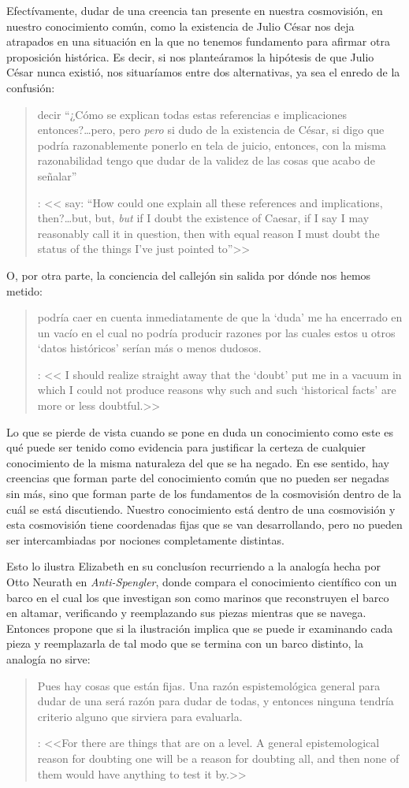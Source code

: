 Efectívamente, dudar de una creencia tan presente en nuestra cosmovisión, en nuestro conocimiento común, como la existencia de Julio César nos deja atrapados en una situación en la que no tenemos fundamento para afirmar otra proposición histórica. Es decir, si nos planteáramos la hipótesis de que Julio César nunca existió, nos situaríamos entre dos alternativas, ya sea el enredo de la confusión: \blockquote[{\cite[91]{anscombe1981parmenides:humeandjulius}}: <<\textelp{} say: ``How could one explain all these references and implications, then?\ldots but, but, \emph{but} if I doubt the existence of Caesar, if I say I may reasonably call it in question, then with equal reason I must doubt the status of the things I've just pointed to''>>]{\textelp{} decir ``¿Cómo se explican todas estas referencias e implicaciones entonces?\ldots pero, pero \emph{pero} si dudo de la existencia de César, si digo que podría razonablemente ponerlo en tela de juicio, entonces, con la misma razonabilidad tengo que dudar de la validez de las cosas que acabo de señalar''}. O, por otra parte, la conciencia del callejón sin salida por dónde nos hemos metido: \blockquote[{\cite[91]{anscombe1981parmenides:humeandjulius}}: <<\textelp{} I should realize straight away that the `doubt' put me in a vacuum in which I could not produce reasons why such and such `historical facts' are more or less doubtful.>>]{\textelp{} podría caer en cuenta inmediatamente de que la `duda' me ha encerrado en un vacío en el cual no podría producir razones por las cuales estos u otros `datos históricos' serían más o menos dudosos.}

Lo que se pierde de vista cuando se pone en duda un conocimiento como este es qué puede ser tenido como evidencia para justificar la certeza de cualquier conocimiento de la misma naturaleza del que se ha negado. En ese sentido, hay creencias que forman parte del conocimiento común que no pueden ser negadas sin más, sino que forman parte de los fundamentos de la cosmovisión dentro de la cuál se está discutiendo. Nuestro conocimiento está dentro de una cosmovisión y esta cosmovisión tiene coordenadas fijas que se van desarrollando, pero no pueden ser intercambiadas por nociones completamente distintas.

Esto lo ilustra Elizabeth en su conclusíon recurriendo a la analogía hecha por Otto Neurath en \emph{Anti-Spengler}, donde compara el conocimiento científico con un barco en el cual los que investigan son como marinos que reconstruyen el barco en altamar, verificando y reemplazando sus piezas mientras que se navega. Entonces propone que si la ilustración implica que se puede ir examinando cada pieza y reemplazarla de tal modo que se termina con un barco distinto, la analogía no sirve: \blockquote[{\cite[92]{anscombe1981parmenides:humeandjulius}}: <<For there are things that are on a level. A general epistemological reason for doubting one will be a reason for doubting all, and then none of them would have anything to test it by.>>]{Pues hay cosas que están fijas. Una razón espistemológica general para dudar de una será razón para dudar de todas, y entonces ninguna tendría criterio alguno que sirviera para evaluarla.}
